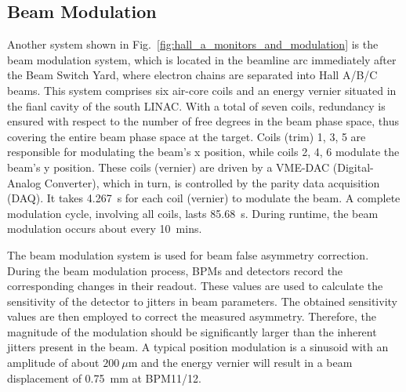 \subsection{Beam Modulation}
\begin{comment}
It is very important for PVES to control the systematic uncertainty, especially
the one from beam fluctuation (HCBA). Ideally, the electrons bunches with opposite
polarization should have exactly the same intensity and energy, hitting the target 
at the same place with the same angle, which is obviously impossible in reality. 
So we need to correct the false asymmetry introduced by the beam fluctuation. There are a
few methods to do the correction, one of them is the so-called Beam modulation.
The idea is to introduce man-made fluctuations to the beam through the 
modulation system, then we can measure the changes in monitors and detectors 
to find the sensitivities of detectors to changes in energy, position and angle,
which will be used to correct the measured asymmetry.
\end{comment}

Another system shown in Fig.~\ref{fig:hall_a_monitors_and_modulation} is the
beam modulation system, which is located in the beamline arc immediately after the Beam Switch Yard,
where electron chains are separated into Hall A/B/C beams.
This system comprises six air-core coils and an energy vernier situated in the 
fianl cavity of the south LINAC. With a total of seven coils, redundancy is ensured
with respect to the number of free degrees in the beam phase space, thus 
covering the entire beam phase space at the target.  
Coils (trim) 1, 3, 5 are responsible for modulating the beam's x position, while coils
2, 4, 6 modulate the beam's y position. These coils (vernier) are driven by a 
VME-DAC (Digital-Analog Converter), which in turn, is controlled by the 
parity data acquisition (DAQ). It takes 4.267~s for each coil (vernier) to modulate the beam.
A complete modulation cycle, involving all coils, lasts 85.68~s. During runtime,
the beam modulation occurs about every 10~mins. 

The beam modulation system is used for beam false asymmetry correction. 
During the beam modulation process, BPMs and detectors record the corresponding
changes in their readout. These values are used to calculate the sensitivity of 
the detector to jitters in beam parameters. The obtained sensitivity values are 
then employed to correct the measured asymmetry. Therefore, the magnitude of the 
modulation should be significantly larger than the inherent jitters present in
the beam. A typical position modulation is a sinusoid with an amplitude of about $200\ \mu$m 
and the energy vernier will result in a beam displacement of 0.75~mm at BPM11/12.

